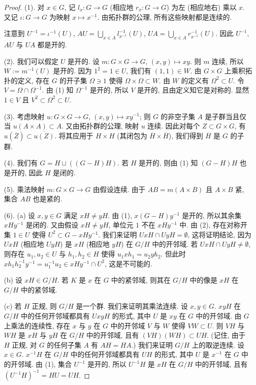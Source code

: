\begin{proof}
(1). 对 $x \in G$, 记 $l_x \colon G \to G$ (相应地 $r_x \colon G \to G$) 为左 (相应地右) 乘以 $x$. 又记 $\iota \colon G \to G$ 为映射 $x \longmapsto x^{-1}$. 由拓扑群的公理, 所有这些映射都是连续的.

注意到 $U^{-1} = \iota^{-1}(U)$, $AU = \bigcup_{x \in A} l_{x^{-1}}^{-1}(U)$, $UA = \bigcup_{x \in A} r_{x^{-1}}^{-1}(U)$. 因此 $U^{-1}$, $AU$ 与 $UA$ 都是开的.

(2). 我们可以假定 $U$ 是开的. 设 $m \colon G \times G \to G$, $(x,y) \longmapsto xy$. 则 $m$ 连续, 所以 $W := m^{-1}(U)$ 是开的. 因为 $1^2 = 1 \in U$, 我们有 $(1,1) \in W$. 由 $G \times G$ 上乘积拓扑的定义, 存在 $G$ 的开子集 $\Omega \ni 1$ 使得 $\Omega \times \Omega \subset W$. 由 $W$ 的定义有 $\Omega^2 \subset U$. 令 $V = \Omega \cap \Omega^{-1}$. 由 (1) 知 $\Omega^{-1}$ 是开的, 所以 $V$ 是开的, 且由定义知它是对称的. 显然 $1 \in V$ 且 $V^2 \subset \Omega^2 \subset U$.

(3). 考虑映射 $u \colon G \times G \to G$, $(x,y) \longmapsto xy^{-1}$; 则 $G$ 的非空子集 $A$ 是子群当且仅当 $u(A \times A) \subset A$. 又由拓扑群的公理, 映射 $u$ 连续. 因此对每个 $Z \subset G \times G$, 有 $u(\overline{Z}) \subset \overline{u(Z)}$. 将其应用于 $H \times H$ (其闭包为 $\overline{H} \times \overline{H}$), 我们得到 $\overline{H}$ 是 $G$ 的子群.

(4). 我们有 $G = H \sqcup ((G - H)H)$. 若 $H$ 是开的, 则由 (1) 知 $(G - H)H$ 也是开的, 因此 $H$ 是闭的.

(5). 乘法映射 $m \colon G \times G \to G$ 由假设连续. 由于 $AB = m(A \times B)$ 且 $A \times B$ 紧, 集合 $AB$ 也是紧的.

(6). (a) 设 $x, y \in G$ 满足 $xH \neq yH$. 由 (1), $x(G - H)y^{-1}$ 是开的, 所以其余集 $xHy^{-1}$ 是闭的. 又由假设 $xH \neq yH$, 单位元 $1$ 不在 $xHy^{-1}$ 中. 由 (2), 存在对称开集 $1 \in U$ 使得 $U^2 \subset G - xHy^{-1}$. 我们来证明 $UxH \cap UyH = \emptyset$, 这将证明结论, 因为 $UxH$ (相应地 $UyH$) 是 $xH$ (相应地 $yH$) 在 $G/H$ 中的开邻域. 若 $UxH \cap UyH \neq \emptyset$, 则存在 $u_1, u_2 \in U$ 与 $h_1, h_2 \in H$ 使得 $u_1xh_1 = u_2yh_2$. 但此时 $xh_1h_2^{-1}y^{-1} = u_1^{-1}u_2 \in xHy^{-1} \cap U^2$, 这是不可能的.

(b) 设 $xH \in G/H$. 若 $K$ 是 $x$ 在 $G$ 中的紧邻域, 则其在 $G/H$ 中的像是 $xH$ 在 $G/H$ 中的紧邻域.

(c) 若 $H$ 正规, 则 $G/H$ 是一个群. 我们来证明其乘法连续. 设 $x, y \in G$. $xyH$ 在 $G/H$ 中的任何开邻域都具有 $UxyH$ 的形式, 其中 $U$ 是 $xy$ 在 $G$ 中的开邻域. 由 $G$ 上乘法的连续性, 存在 $x$ 与 $y$ 在 $G$ 中的开邻域 $V$ 与 $W$ 使得 $VW \subset U$. 则 $VH$ 与 $WH$ 是 $xH$ 与 $yH$ 在 $G/H$ 中的开邻域, 且有 $(VH)(WH) \subset UH$. (记住, 由于 $H$ 正规, 对 $G$ 的任何子集 $A$ 有 $AH = HA$.) 我们来证明 $G/H$ 上的取逆连续. 设 $x \in G$. $x^{-1}H$ 在 $G/H$ 中的任何开邻域都具有 $UH$ 的形式, 其中 $U$ 是 $x^{-1}$ 在 $G$ 中的开邻域. 由 (1), 集合 $U^{-1}$ 是开的, 所以 $U^{-1}H$ 是 $xH$ 在 $G/H$ 中的开邻域, 且有 $(U^{-1}H)^{-1} = HU = UH$.
\end{proof}

